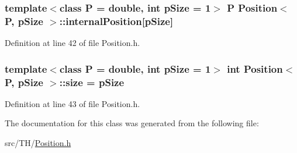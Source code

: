 \subsubsection[{\texorpdfstring{internal\+Position}{internalPosition}}]{\setlength{\rightskip}{0pt plus 5cm}template$<$class P = double, int p\+Size = 1$>$ P {\bf Position}$<$ P, p\+Size $>$\+::internal\+Position\mbox{[}p\+Size\mbox{]}}\hypertarget{structPosition_a16cc1f2b7a03ca527033e3215577f374}{}\label{structPosition_a16cc1f2b7a03ca527033e3215577f374}


Definition at line 42 of file Position.\+h.

\subsubsection[{\texorpdfstring{size}{size}}]{\setlength{\rightskip}{0pt plus 5cm}template$<$class P = double, int p\+Size = 1$>$ int {\bf Position}$<$ P, p\+Size $>$\+::size = p\+Size}\hypertarget{structPosition_afe6a7e5b5ba96b43714fa94c5eb8f7d5}{}\label{structPosition_afe6a7e5b5ba96b43714fa94c5eb8f7d5}


Definition at line 43 of file Position.\+h.



The documentation for this class was generated from the following file\+:\begin{DoxyCompactItemize}
\item 
src/\+T\+H/\hyperlink{Position_8h}{Position.\+h}\end{DoxyCompactItemize}
